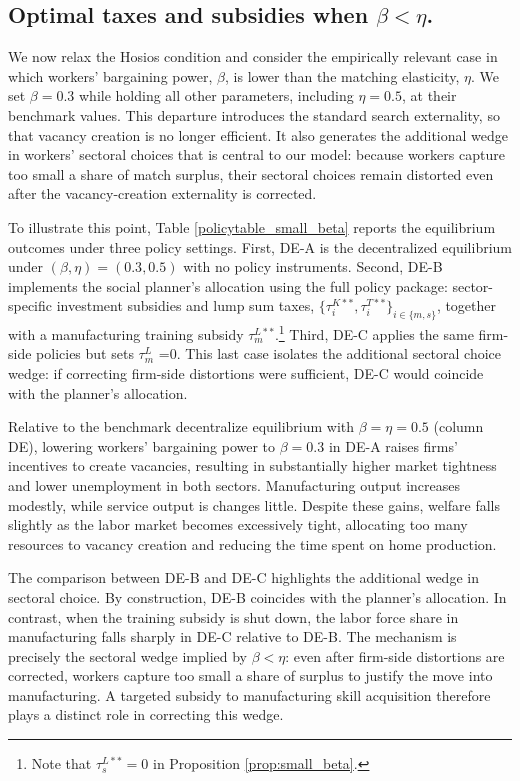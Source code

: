 \documentclass[12pt]{article} %
\theoremstyle{definition}
\begin{document}
\subsection{Optimal taxes and subsidies when $\beta<\eta$.}

We now relax the Hosios condition and consider the empirically relevant case in which workers' bargaining power, $\beta$, is lower than the matching elasticity, $\eta$. We set $\beta=0.3$ while holding all other parameters, including $\eta=0.5$, at their benchmark values. This departure introduces the standard search externality, so that vacancy creation is no longer efficient. It also generates the additional wedge in workers' sectoral choices that is central to our model:  because workers capture too small a share of match surplus,  their sectoral choices remain distorted even after the vacancy-creation externality is corrected.  

To illustrate this point, Table \ref{policytable_small_beta} reports the equilibrium outcomes under three policy settings. First, DE-A is the decentralized equilibrium under $(\beta, \eta)=(0.3, 0.5)$ with no policy instruments. Second, DE-B implements the social planner's allocation using the full policy package: sector-specific investment subsidies and lump sum taxes, $\{\tau^{K**}_i, \tau^{T**}_i\}_{i \in \{m,s\}}$, together with a manufacturing training subsidy   $\tau^{L**}_m$.\footnote{Note that $\tau^{L**}_s=0$ in Proposition \ref{prop:small_beta}.} Third, DE-C applies the same firm-side policies but sets  $\tau_m^{L}$ =0.  This last case isolates the additional sectoral choice wedge: if correcting firm-side distortions were sufficient,  DE-C would coincide with the planner's allocation. 




Relative to the benchmark decentralize equilibrium with $\beta=\eta=0.5$ (column DE), lowering workers' bargaining power to $\beta=0.3$ in DE-A raises firms' incentives to create vacancies, resulting in substantially higher market tightness and lower unemployment  in both sectors. Manufacturing output increases modestly, while service output is changes little. Despite these gains, welfare falls slightly as the labor market becomes excessively tight, allocating too many resources to vacancy creation and reducing the time spent on home production.  %

The comparison between DE-B and DE-C highlights the additional wedge in sectoral choice. By construction, DE-B coincides with the planner's allocation. In contrast, when the training subsidy is shut down, the labor force share in manufacturing falls sharply in DE-C relative to DE-B. The mechanism is precisely the sectoral wedge implied by $\beta<\eta$: even after firm-side distortions are corrected, workers capture too small a share of surplus to justify the move into manufacturing. A targeted subsidy to manufacturing skill acquisition therefore plays a distinct role in correcting this wedge. 
\end{document}
